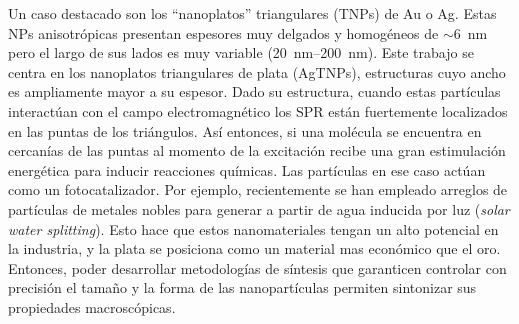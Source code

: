Un caso destacado son los ``nanoplatos'' triangulares (TNPs) de Au o Ag. Estas NPs anisotrópicas presentan espesores muy delgados y homogéneos de $\sim$\qty{6}{\nano\meter} pero el largo de sus lados es muy variable (\qtyrange{20}{200}{\nano\meter}). Este trabajo se centra en los nanoplatos triangulares de plata (AgTNPs), estructuras cuyo ancho es ampliamente mayor a su espesor. Dado su estructura, cuando estas partículas interactúan con el campo electromagnético los SPR están fuertemente localizados en las puntas de los triángulos. Así entonces, si una molécula se encuentra en cercanías de las puntas al momento de la excitación recibe una gran estimulación energética para inducir reacciones químicas. Las partículas en ese caso actúan como un fotocatalizador. Por ejemplo, recientemente se han empleado arreglos de partículas de metales nobles para generar  a partir de agua inducida por luz (\textit{solar water splitting}).\cite{herran_plasmonic_2023} Esto hace que estos nanomateriales tengan un alto potencial en la industria, y la plata se posiciona como un material mas económico que el oro. Entonces, poder desarrollar metodologías de síntesis que garanticen controlar con precisión el tamaño y la forma de las nanopartículas permiten sintonizar sus propiedades macroscópicas.

